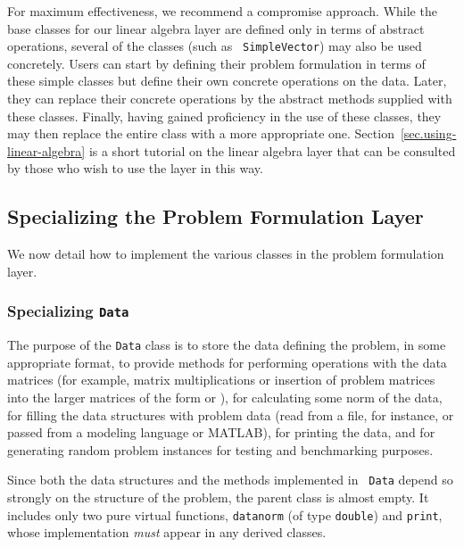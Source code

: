 For maximum effectiveness, we recommend a compromise approach. While
the base classes for our linear algebra layer are defined only in
terms of abstract operations, several of the classes (such as {\tt
SimpleVector}) may also be used concretely.  Users can start by
defining their problem formulation in terms of these simple classes
but define their own concrete operations on the data. Later, they can
replace their concrete operations by the abstract methods supplied
with these classes. Finally, having gained proficiency in the use of
these classes, they may then replace the entire class with a more
appropriate one.  Section~\ref{sec.using-linear-algebra} is a short
tutorial on the linear algebra layer that can be consulted by those
who wish to use the layer in this way.

\subsection{Specializing the Problem Formulation Layer}

We now detail how to implement the various classes in the problem
formulation layer.

\subsubsection{Specializing {\tt Data}}
\label{sec:dataclass}

The purpose of the {\tt Data} class is to store the data defining the
problem, in some appropriate format, to provide methods for performing
operations with the data matrices (for example, matrix
multiplications or insertion of problem matrices into the larger
matrices of the form  or ), for
calculating some norm of the data, for filling the data structures
with problem data (read from a file, for instance, or passed from a
modeling language or MATLAB), for printing the data, and for
generating random problem instances for testing and benchmarking
purposes.

Since both the data structures and the methods implemented in {\tt
  Data} depend so strongly on the structure of the problem, the parent
class is almost empty.  It includes only two pure virtual functions,
{\tt datanorm} (of type {\tt double}) and {\tt print}, whose
implementation {\em must} appear in any derived classes.

